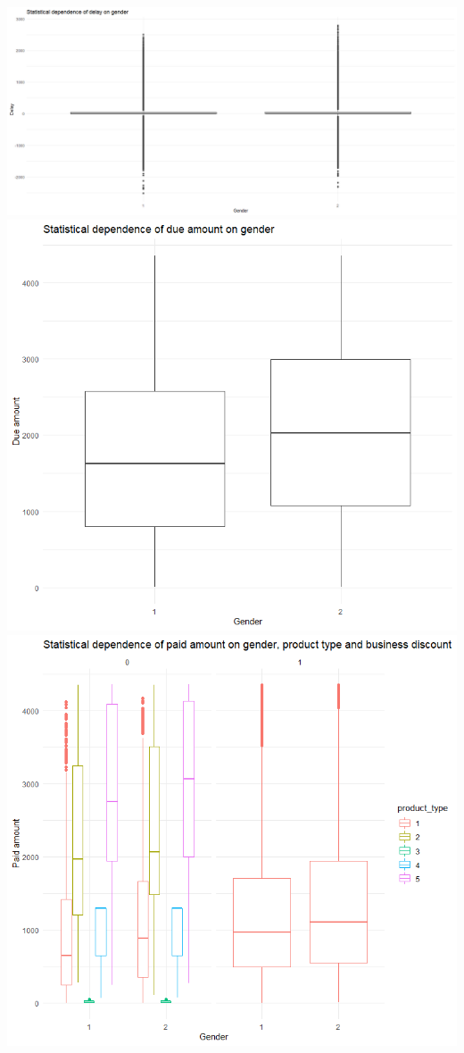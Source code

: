 \documentclass[
]{article}
\begin{document}
\includegraphics{Statistical dependence of delay on gender.png}
\includegraphics{Statistical dependence of due amount on gender.png}
\includegraphics{Statistical dependence of paid amount on gender, product type and business discount.png}
\end{document}
